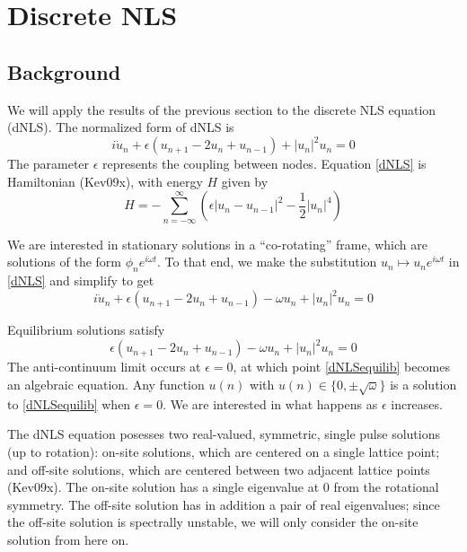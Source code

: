 \documentclass[12pt]{article}
\begin{document}
\section{Discrete NLS}

\subsection{Background}

We will apply the results of the previous section to the discrete NLS equation (dNLS). The normalized form of dNLS is
\begin{equation}\label{dNLS}
i\dot{u}_n + \epsilon(u_{n+1} - 2 u_n + u_{n-1}) + |u_n|^2 u_n = 0
\end{equation}
The parameter $\epsilon$ represents the coupling between nodes. Equation \eqref{dNLS} is Hamiltonian (Kev09x), with energy $H$ given by
\[
H = -\sum_{n=-\infty}^\infty\left( \epsilon|u_n - u_{n-1}|^2
-\frac{1}{2}|u_n|^4 \right)
\]

We are interested in stationary solutions in a ``co-rotating'' frame, which are solutions of the form $\phi_n e^{i \omega t}$. To that end, we make the substitution $u_n \mapsto u_n e^{i \omega t}$ in \eqref{dNLS} and simplify to get
\begin{equation}\label{dNLSrot}
i\dot{u}_n + \epsilon(u_{n+1} - 2 u_n + u_{n-1}) - \omega u_n + |u_n|^2 u_n = 0
\end{equation}

Equilibrium solutions satisfy
\begin{equation}\label{dNLSequilib}
\epsilon(u_{n+1} - 2 u_n + u_{n-1}) - \omega u_n + |u_n|^2 u_n = 0
\end{equation}
The anti-continuum limit occurs at $\epsilon = 0$, at which point \eqref{dNLSequilib} becomes an algebraic equation. Any function $u(n)$ with $u(n) \in \{ 0, \pm \sqrt{\omega}\}$ is a solution to \eqref{dNLSequilib} when $\epsilon = 0$. We are interested in what happens as $\epsilon$ increases.

The dNLS equation posesses two real-valued, symmetric, single pulse solutions (up to rotation): on-site solutions, which are centered on a single lattice point; and off-site solutions, which are centered between two adjacent lattice points (Kev09x). The on-site solution has a single eigenvalue at 0 from the rotational symmetry. The off-site solution has in addition a pair of real eigenvalues; since the off-site solution is spectrally unstable, we will only consider the on-site solution from here on. 
\end{document}
